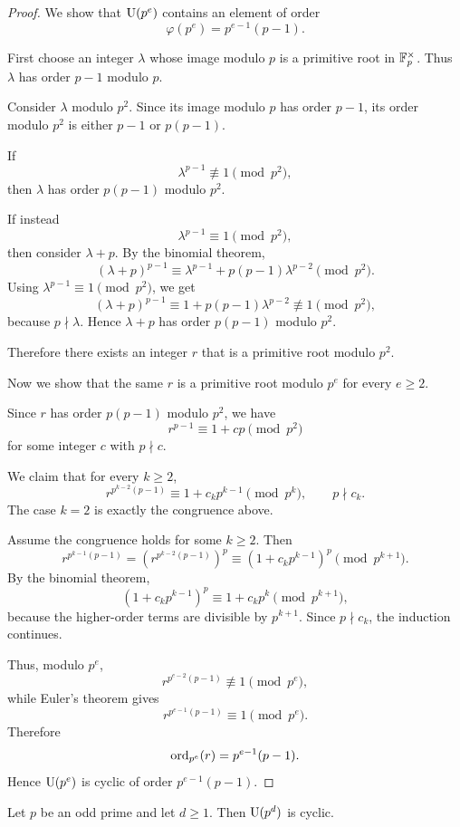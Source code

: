 \begin{proof}
We show that $\mathrm{U}(p^e)$ contains an element of order
\[
    \varphi(p^e)=p^{e-1}(p-1).
\]

First choose an integer $\lambda$ whose image modulo $p$ is a primitive root in $\mathbb{F}_p^\times$. Thus $\lambda$ has order $p-1$ modulo $p$.

Consider $\lambda$ modulo $p^2$. Since its image modulo $p$ has order $p-1$, its order modulo $p^2$ is either $p-1$ or $p(p-1)$.

If
\[
    \lambda^{p-1}\not\equiv 1\pmod{p^2},
\]
then $\lambda$ has order $p(p-1)$ modulo $p^2$.

If instead
\[
    \lambda^{p-1}\equiv 1\pmod{p^2},
\]
then consider $\lambda+p$. By the binomial theorem,
\[
    (\lambda+p)^{p-1}
    \equiv
    \lambda^{p-1}+p(p-1)\lambda^{p-2}
    \pmod{p^2}.
\]
Using $\lambda^{p-1}\equiv1\pmod{p^2}$, we get
\[
    (\lambda+p)^{p-1}
    \equiv
    1+p(p-1)\lambda^{p-2}
    \not\equiv 1\pmod{p^2},
\]
because $p\nmid \lambda$. Hence $\lambda+p$ has order $p(p-1)$ modulo $p^2$.

Therefore there exists an integer $r$ that is a primitive root modulo $p^2$.

Now we show that the same $r$ is a primitive root modulo $p^e$ for every $e\geq2$.

Since $r$ has order $p(p-1)$ modulo $p^2$, we have
\[
    r^{p-1}\equiv 1+cp\pmod{p^2}
\]
for some integer $c$ with $p\nmid c$.

We claim that for every $k\geq2$,
\[
    r^{p^{k-2}(p-1)}
    \equiv 1+c_kp^{k-1}\pmod{p^k},
    \qquad p\nmid c_k.
\]
The case $k=2$ is exactly the congruence above.

Assume the congruence holds for some $k\geq2$. Then
\[
    r^{p^{k-1}(p-1)}
    =
    \left(r^{p^{k-2}(p-1)}\right)^p
    \equiv
    (1+c_kp^{k-1})^p
    \pmod{p^{k+1}}.
\]
By the binomial theorem,
\[
    (1+c_kp^{k-1})^p
    \equiv
    1+c_kp^k
    \pmod{p^{k+1}},
\]
because the higher-order terms are divisible by $p^{k+1}$. Since $p\nmid c_k$, the induction continues.

Thus, modulo $p^e$,
\[
    r^{p^{e-2}(p-1)}\not\equiv 1\pmod{p^e},
\]
while Euler's theorem gives
\[
    r^{p^{e-1}(p-1)}\equiv1\pmod{p^e}.
\]
Therefore
\[
    \operatorname{ord}_{p^e}(r)=p^{e-1}(p-1).
\]
Hence $\mathrm{U}(p^e)$ is cyclic of order $p^{e-1}(p-1)$.
\end{proof}

\begin{proposition}\label{prop:odd-prime-power-sylow}
Let $p$ be an odd prime and let $d\geq1$. Then $\mathrm{U}(p^d)$ is cyclic.
\end{proposition}


